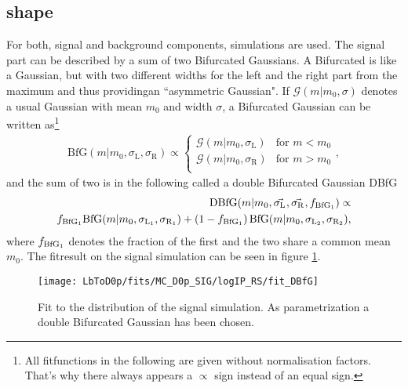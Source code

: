 \subsection{\logIP shape}
For both, \logIP signal and background components, simulations are used. 
The signal part can be described by a sum of two Bifurcated Gaussians.
A Bifurcated is like a Gaussian, but with two different widths for the left and the right part from the maximum and thus providingan ``asymmetric Gaussian".
If $\mathcal{G}(m|m_0,\sigma)$ denotes a usual Gaussian with mean $m_0$ and width $\sigma$, a Bifurcated Gaussian can be written as\footnote{All fitfunctions in the following are given without normalisation factors. That's why there always appears a $\propto$ sign instead of an equal sign.}
\begin{align}
    \text{BfG}(m|m_0, \sigma_{\text{L}}, \sigma_{\text{R}}) \propto 
    \begin{cases}
        \mathcal{G}(m|m_0,\sigma_{\text{L}}) & \text{for } m < m_0 \\   
        \mathcal{G}(m|m_0,\sigma_{\text{R}}) & \text{for } m > m_0 \\   
    \end{cases},
\end{align}
and the sum of two is in the following called a double Bifurcated Gaussian DBfG
\begin{align}
    \text{DBfG}(m|m_0,\vec{\sigma_{\text{L}_{}}}, \vec{\sigma_{\text{R}_{}}}, f_{\text{BfG}_1}) \propto \\
    f_{\text{BfG}_1} \text{BfG}(m|m_0,\sigma_{\text{L}_{1}}, \sigma_{\text{R}_{1}}) + \left(1 - f_{\text{BfG}_1} \right) \text{BfG}(m|m_0,\sigma_{\text{L}_{2}}, \sigma_{\text{R}_{2}}),
\end{align}
where $f_{\text{BfG}_1}$ denotes the fraction of the first \BfG and the two \BfG share a common mean $m_0$. The fitresult on the signal simulation can be seen in figure \ref{fig:fit_logIP_signal}.
\begin{figure}[hptb]
    \centering
	\texttt{[image: LbToD0p/fits/MC\_D0p\_SIG/logIP\_RS/fit\_DBfG]}
	\caption{Fit to the \logIP distribution of the signal simulation. As parametrization a double Bifurcated Gaussian has been chosen.}
    \label{fig:fit_logIP_signal}
\end{figure}


